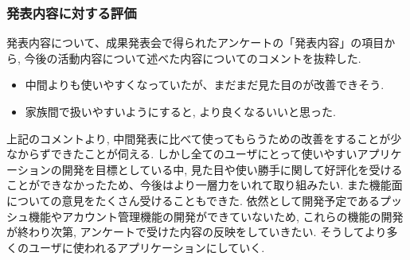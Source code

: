 \subsubsection{発表内容に対する評価}
発表内容について、成果発表会で得られたアンケートの「発表内容」の項目から, 今後の活動内容について述べた内容についてのコメントを抜粋した.
\begin{itemize}
    \item 中間よりも使いやすくなっていたが、まだまだ見た目のが改善できそう.
    \item 家族間で扱いやすいようにすると, より良くなるいいと思った.
\end{itemize}
    上記のコメントより, 中間発表に比べて使ってもらうための改善をすることが少なからずできたことが伺える. しかし全てのユーザにとって使いやすいアプリケーションの開発を目標としている中,
     見た目や使い勝手に関して好評化を受けることができなかったため、今後はより一層力をいれて取り組みたい.
     また機能面についての意見をたくさん受けることもできた. 依然として開発予定であるプッシュ機能やアカウント管理機能の開発ができていないため,
     これらの機能の開発が終わり次第, アンケートで受けた内容の反映をしていきたい. そうしてより多くのユーザに使われるアプリケーションにしていく.
